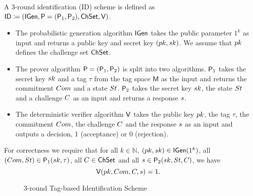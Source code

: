 \begin{definition}
A 3-round identification (ID) scheme is defined as $\mathsf{ID} \coloneqq(\mathsf{IGen}, \mathsf{P}=(\mathsf{P}_1,\mathsf{P}_2) ,\mathsf{ChSet}, \mathsf{V})$.
\begin{itemize}
\item The probabilistic generation algorithm $\mathsf{IGen}$ takes the public parameter $1^k$ as input and returns a public key and secret key $(pk,sk)$. We assume that $pk$ defines the challenge set $\mathsf{ChSet}$.

\item The prover algorithm $\mathsf{P} = (\mathsf{P}_1,\mathsf{P}_2)$ is split into two algorithms. $\mathsf{P}_1$ takes the secret key $sk$ and a tag $\tau$ from the tag space $\mathsf{M}$ as the input and returns the commitment $Com$ and a state $St$. $\mathsf{P}_2$ takes the secret key $sk$, the state $St$ and a challenge $C$ as an input and returns a response $s$. 

\item The deterministic verifier algorithm $\mathsf{V}$ takes the public key $pk$, the tag $\tau$, the commitment $Com$, the challenge $C$ and the response $s$ as an input and outputs a decision, 1 (acceptance) or 0 (rejection).
\end{itemize}
For correctness we require that for all $k \in \mathbb{N}$,
$(pk,sk) \in \mathsf{IGen}(1^k)$,
all
$(Com,St) \in \mathsf{P}_1(sk, \tau)$,
all $C \in \mathsf{ChSet}$ and all 
$s \in \mathsf{P}_2(sk,St,C)$,
we have
$$ \mathsf{V}(pk,Com,C,s) = 1.$$
\begin{figure}[H]
  \centering
   \nicoresetlinenr
\vspace{2em}
  \caption{3-round Tag-based Identification Scheme}
 \end{figure}

\end{definition}


